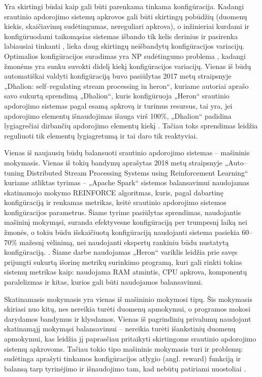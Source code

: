 \documentclass{VUMIFPSbakalaurinis}
\begin{document}
Yra skirtingi būdai kaip gali būti parenkama tinkama konfigūracija. Kadangi srautinio apdorojimo sistemų apkrovos gali būti skirtingų pobūdžių (duomenų kiekis, skaičiavimų sudėtingumas, nereguliari apkrova), o inžinieriai kurdami ir konfigūruodami taikomąsias sistemas išbando tik kelis derinius ir pasirenka labiausiai tinkanti \cite{selfRegulatingStreaming}, lieka daug skirtingų neišbandytų konfigūracijos variacijų. Optimalios konfigūracijos suradimas yra NP sudėtingumo problema \cite{automateTuning}, kadangi žmonėms yra sunku suvokti didelį kiekį konfigūracijos variacijų. 
Vienas iš būdų automatiškai valdyti konfigūraciją buvo pasiūlytas 2017 metų straipsnyje „Dhalion: self–regulating stream processing in heron“, kuriame autoriai aprašo savo sukurtą sprendimą „Dhalion“, kuris konfigūruoja „Heron“ srautinio apdorojimo sistemas pagal esamą apkrovą ir turimus resursus, tai yra, jei apdorojimo elementų išnaudojimas išauga virš 100\%, „Dhalion“ padidina lygiagrečiai dirbančių apdorojimo elementų kiekį \cite{dhalion}. Tačiau toks sprendimas leidžia reguliuoti tik elementų lygiagretumą ir tai daro tik reaktyviai.

Vienas iš naujausių būdų balansuoti srautinio apdorojimo sistemas – mašininis mokymasis. Vienas iš tokių bandymų aprašytas 2018 metų straipsnyje „Auto–tuning Distributed Stream Processing Systems using Reinforcement Learning“\cite{vaquero2018autotuning} kuriame atliktas tyrimas – „Apache Spark“ sistemos balansavimui naudojamas skatinamojo mokymo REINFORCE algoritmas, kuris, pagal dabartinę konfigūraciją ir renkamas metrikas, keitė srautinio apdorojimo sistemos konfigūracijos parametrus. Šiame tyrime pasiūlytas sprendimas, naudojantis mašininį mokymąsi, suranda efektyvesne konfigūraciją per trumpesnį laiką nei žmonės, o tokiu būdu išskaičiuotą konfigūraciją naudojanti sistema pasiekia 60–70\% mažesnį vėlinimą, nei naudojanti ekspertų rankiniu būdu nustatytą konfigūraciją. \cite{vaquero2018autotuning}. Šiame darbe naudojamas „Heron“ variklis leidžia prie savęs prijungti sukurtą išorinę metrikų surinkimo programą, kuri gali rinkti tokias sistemų metrikas kaip: naudojama RAM atmintis, CPU apkrova, komponentų paralelizmas ir kitas, kurios gali būti naudojamos balansavimui. 

Skatinamasis mokymasis yra vienas iš mašininio mokymosi tipų. Šis mokymasis skiriasi nuo kitų, nes nereikia turėti duomenų apmokymui, o programos mokosi darydamos bandymus ir klysdamos. Vienas iš pagrindinių privalumų naudojant skatinamąjį mokymąsi balansavimui – nereikia turėti išankstinių duomenų apmokymui, kas leidžia jį paprasčiau pritaikyti skirtingoms srautinio apdorojimo sistemų apkrovoms. Tačiau tokio tipo mašininis mokymasis turi ir problemų: sudėtinga aprašyti tinkamos konfigūracijos atlygio (angl. reward) funkciją ir balansą tarp tyrinėjimo ir išnaudojimo tam, kad nebūtų patiriami nuostoliai \cite{selfRegulatingStreaming}.
\end{document}
